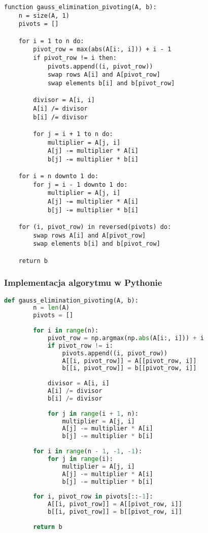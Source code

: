\documentclass[12pt,a4paper,table]{article}
\begin{document}
    \begin{lstlisting}[]
    function gauss_elimination_pivoting(A, b):
    n = size(A, 1)
    pivots = []

    for i = 1 to n do:
        pivot_row = max(abs(A[i:, i])) + i - 1
        if pivot_row != i then:
            pivots.append((i, pivot_row))
            swap rows A[i] and A[pivot_row]
            swap elements b[i] and b[pivot_row]

        divisor = A[i, i]
        A[i] /= divisor
        b[i] /= divisor

        for j = i + 1 to n do:
            multiplier = A[j, i]
            A[j] -= multiplier * A[i]
            b[j] -= multiplier * b[i]

    for i = n downto 1 do:
        for j = i - 1 downto 1 do:
            multiplier = A[j, i]
            A[j] -= multiplier * A[i]
            b[j] -= multiplier * b[i]

    for (i, pivot_row) in reversed(pivots) do:
        swap rows A[i] and A[pivot_row]
        swap elements b[i] and b[pivot_row]

    return b
    \end{lstlisting}

    \subsubsection{Implementacja algorytmu w Pythonie}
    \begin{lstlisting}[language=Python]
    def gauss_elimination_pivoting(A, b):
        n = len(A)
        pivots = []
        
        for i in range(n):
            pivot_row = np.argmax(np.abs(A[i:, i])) + i
            if pivot_row != i:
                pivots.append((i, pivot_row))
                A[[i, pivot_row]] = A[[pivot_row, i]]
                b[[i, pivot_row]] = b[[pivot_row, i]]
            
            divisor = A[i, i]
            A[i] /= divisor
            b[i] /= divisor
            
            for j in range(i + 1, n):
                multiplier = A[j, i]
                A[j] -= multiplier * A[i]
                b[j] -= multiplier * b[i]
    
        for i in range(n - 1, -1, -1):
            for j in range(i):
                multiplier = A[j, i]
                A[j] -= multiplier * A[i]
                b[j] -= multiplier * b[i]
    
        for i, pivot_row in pivots[::-1]: 
            A[[i, pivot_row]] = A[[pivot_row, i]]
            b[[i, pivot_row]] = b[[pivot_row, i]]
    
        return b

    \end{lstlisting}
\end{document}
